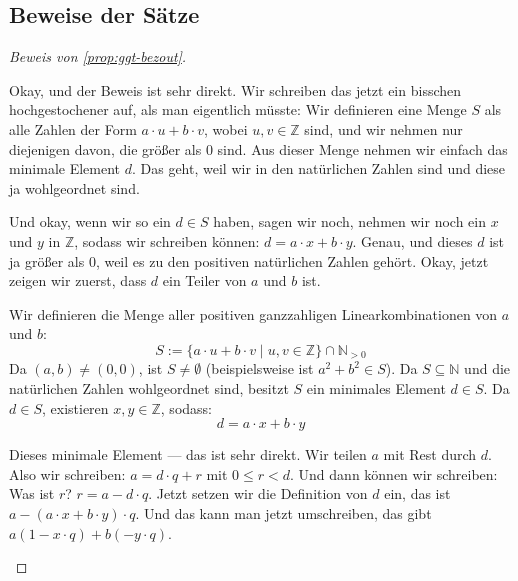 \subsection{Beweise der Sätze}

\begin{proof}[Beweis von \cref{prop:ggt-bezout}]
\begin{spoken-clean}[00:17:09 - 00:18:28]
Okay, und der Beweis ist sehr direkt. Wir schreiben das jetzt ein bisschen hochgestochener auf, als man eigentlich müsste: Wir definieren eine Menge $S$ als alle Zahlen der Form $a \cdot u + b \cdot v$, wobei $u, v \in \mathbb{Z}$ sind, und wir nehmen nur diejenigen davon, die größer als $0$ sind. Aus dieser Menge nehmen wir einfach das minimale Element $d$. Das geht, weil wir in den natürlichen Zahlen sind und diese ja wohlgeordnet sind.

Und okay, wenn wir so ein $d \in S$ haben, sagen wir noch, nehmen wir noch ein $x$ und $y$ in $\mathbb{Z}$, sodass wir schreiben können: $d = a \cdot x + b \cdot y$. Genau, und dieses $d$ ist ja größer als $0$, weil es zu den positiven natürlichen Zahlen gehört. Okay, jetzt zeigen wir zuerst, dass $d$ ein Teiler von $a$ und $b$ ist.
\end{spoken-clean}

\begin{math-stroke}
\begin{ai-proof-skeleton-invisible-content}
\end{ai-proof-skeleton-invisible-content}

Wir definieren die Menge aller positiven ganzzahligen Linearkombinationen von $a$ und $b$:
\[ S := \{ a \cdot u + b \cdot v \mid u, v \in \mathbb{Z} \} \cap \mathbb{N}_{>0} \]
Da $(a, b) \neq (0,0)$, ist $S \neq \emptyset$ (beispielsweise ist $a^2 + b^2 \in S$). Da $S \subseteq \mathbb{N}$ und die natürlichen Zahlen wohlgeordnet sind, besitzt $S$ ein minimales Element $d \in S$.
Da $d \in S$, existieren $x, y \in \mathbb{Z}$, sodass:
\[ d = a \cdot x + b \cdot y \]
\end{math-stroke}

\begin{spoken-clean}[00:18:28 - 00:22:20]
Dieses minimale Element --- das ist sehr direkt. Wir teilen $a$ mit Rest durch $d$. Also wir schreiben: $a = d \cdot q + r$ mit $0 \le r < d$. Und dann können wir schreiben: Was ist $r$? $r = a - d \cdot q$. Jetzt setzen wir die Definition von $d$ ein, das ist $a - (a \cdot x + b \cdot y) \cdot q$. Und das kann man jetzt umschreiben, das gibt $a(1 - x \cdot q) + b(-y \cdot q)$.


\end{spoken-clean}
\end{proof}
